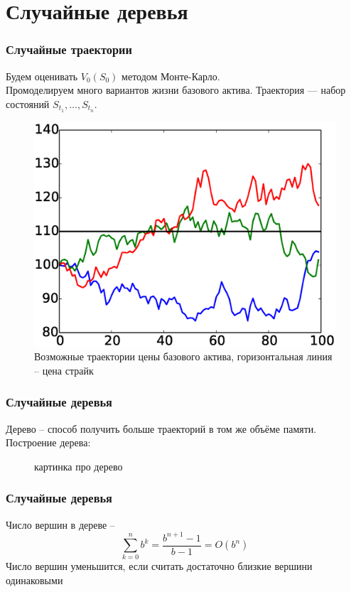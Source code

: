 \documentclass[unicode, notheorems]{beamer}
\begin{document}
\section{Случайные деревья}
    \begin{frame}
        \frametitle{Случайные траектории}
        Будем оценивать $V_0(S_0)$ методом Монте-Карло.
        \\ Промоделируем много вариантов жизни базового актива. Траектория --- набор состояний $S_{t_1}, \ldots, S_{t_n}$.
        \begin{figure}[h]
            \includegraphics[height=0.4\paperheight]{traces}
            \caption{Возможные траектории цены базового актива, горизонтальная линия -- цена страйк}
            \label{fig:traces}
        \end{figure}
    \end{frame}

\begin{frame}
    \frametitle{Случайные деревья}
    Дерево -- способ получить больше траекторий в том же объёме памяти. Построение дерева:
    \begin{figure}[h]
        картинка про дерево
    \end{figure}
\end{frame}

\begin{frame}
    \frametitle{Случайные деревья}
    Число вершин в дереве -- $$\sum_{k=0}^n b^k = \frac{b^{n+1} - 1}{b-1} = O(b^n)$$
    Число вершин уменьшится, если считать достаточно близкие вершини одинаковыми
\end{frame}
\end{document}
